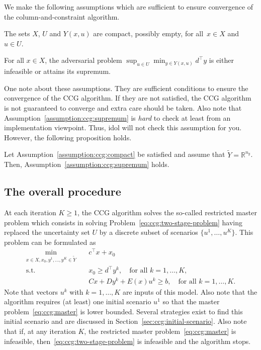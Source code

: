 We make the following assumptions which are sufficient to ensure convergence
of the column-and-constraint algorithm. 

\begin{assumption}
    \label{assumption:ccg:compact}
    The sets $X$, $U$ and $Y(x,u)$ are compact, possibly empty, for all~$x\in
    X$ and~\mbox{$u\in U$}.
\end{assumption}

\begin{assumption}
    \label{assumption:ccg:supremum}
    For all $x\in X$, the adversarial problem $\sup_{u\in U} \min_{y\in
    Y(x,u)} d^\top y$ is either infeasible or attains its supremum. 
\end{assumption}

One note about these assumptions. They are sufficient conditions to ensure the
convergence of the CCG algorithm. If they are not satisfied, the CCG algorithm
is not guaranteed to converge and extra care should be taken. Also note that
Assumption~\ref{assumption:ccg:supremum} is \emph{hard} to check at least from
an implementation viewpoint. Thus, \textsf{idol} will not check this
assumption for you. However, the following proposition holds.

\begin{proposition}
    Let Assumption~\ref{assumption:ccg:compact} be satisfied and assume that
    $\tilde{Y} = \mathbb{R}^{n_y}$. Then,
    Assumption~\ref{assumption:ccg:supremum} holds.
\end{proposition}

\subsection{The overall procedure}

At each iteration $K \ge 1$, the CCG algorithm solves the so-called restricted
master problem which consists in solving
Problem~\eqref{eq:ccg:two-stage-problem} having replaced the uncertainty set
$U$ by a discrete subset of scenarios $\{ u^1, \dotsc, u^K \}$. This problem
can be formulated as  
\begin{subequations}
    \label{eq:ccg:master}
    \begin{align}
        \min_{x\in X, x_0, y^1, \dotsc, y^K\in\tilde{Y}} \quad & c^\top x + x_0 \\
        \text{s.t.} \quad & x_0 \ge d^\top y^k, \quad \text{for all } k=1,\dotsc,K, \\
        & Cx + Dy^k + E(x)u^k \ge b, \quad \text{for all } k=1,\dotsc,K.
    \end{align}
\end{subequations}
Note that vectors $u^k$ with $k=1,\dotsc,K$ are inputs of this model. Also
note that the algorithm requires (at least) one initial scenario $u^1$ so that
the master problem~\eqref{eq:ccg:master} is lower bounded. Several strategies
exist to find this initial scenario and are discussed in
Section~\ref{sec:ccg:initial-scenario}. Also note that if, at any iteration
$K$, the restricted master problem~\eqref{eq:ccg:master} is infeasible,
then~\eqref{eq:ccg:two-stage-problem} is infeasible and the algorithm stops.

